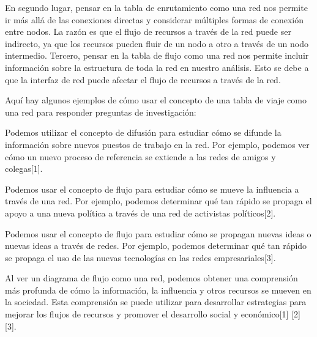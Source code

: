 \documentclass{article}
\begin{document}
En segundo lugar, pensar en la tabla de enrutamiento como una red nos permite ir más allá de las conexiones directas y considerar múltiples formas de conexión entre nodos. La razón es que el flujo de recursos a través de la red puede ser indirecto, ya que los recursos pueden fluir de un nodo a otro a través de un nodo intermedio. Tercero, pensar en la tabla de flujo como una red nos permite incluir información sobre la estructura de toda la red en nuestro análisis. Esto se debe a que la interfaz de red puede afectar el flujo de recursos a través de la red.

Aquí hay algunos ejemplos de cómo usar el concepto de una tabla de viaje como una red para responder preguntas de investigación:

Podemos utilizar el concepto de difusión para estudiar cómo se difunde la información sobre nuevos puestos de trabajo en la red. Por ejemplo, podemos ver cómo un nuevo proceso de referencia se extiende a las redes de amigos y colegas[1].

Podemos usar el concepto de flujo para estudiar cómo se mueve la influencia a través de una red. Por ejemplo, podemos determinar qué tan rápido se propaga el apoyo a una nueva política a través de una red de activistas políticos[2].

Podemos usar el concepto de flujo para estudiar cómo se propagan nuevas ideas o nuevas ideas a través de redes. Por ejemplo, podemos determinar qué tan rápido se propaga el uso de las nuevas tecnologías en las redes empresariales[3].

Al ver un diagrama de flujo como una red, podemos obtener una comprensión más profunda de cómo la información, la influencia y otros recursos se mueven en la sociedad. Esta comprensión se puede utilizar para desarrollar estrategias para mejorar los flujos de recursos y promover el desarrollo social y económico[1] [2] [3]. 
\end{document}
